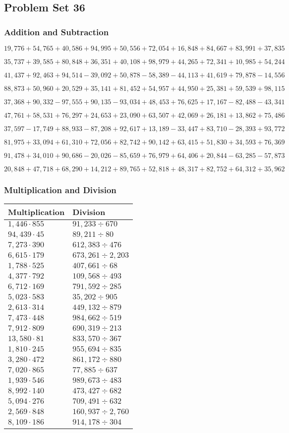 \hypertarget{problem-set-36-4}{%
\subsection{Problem Set 36}\label{problem-set-36-4}}

\hypertarget{addition-and-subtraction-258}{%
\subsubsection{Addition and
Subtraction}\label{addition-and-subtraction-258}}

\(19,776+54,765+40,586+94,995+50,556+72,054+16,848+84,667+83,991+ 37,835\)

\(35,737+39,585+80,848+36,351+40,108+98,979+44,265+72,341+10,985+54,244\)

\(41,437+92,463+94,514-39,092+50,878-58,389-44,113+41,619+79,878-14,556\)

\(88,873+50,960+20,529+35,141+81,452+54,957+44,950+25,381+59,539+98,115\)

\(37,368+90,332-97,555+90,135-93,034+48,453+76,625+17,167-82,488-43,341\)

\(47,761+58,531+76,297+24,653+23,090+63,507+42,069+26,181+13,862+75,486\)

\(37,597-17,749+88,933-87,208+92,617+13,189-33,447+83,710-28,393+93,772\)

\(81,975+33,094+61,310+72,056+82,742+90,142+63,415+51,830+34,593+76,369\)

\(91,478+34,010+90,686-20,026-85,659+76,979+64,406+20,844-63,285-57,873\)

\(20,848+47,718+68,290+14,212+89,765+52,818+48,317+82,752+64,312+35,962\)

\hypertarget{multiplication-and-division-257}{%
\subsubsection{Multiplication and
Division}\label{multiplication-and-division-257}}

\begin{longtable}[]{@{}ll@{}}
\toprule
Multiplication & Division\tabularnewline
\midrule
\endhead
\(1,446\cdot855\) & \(91,233÷670\)\tabularnewline
\(94,439\cdot45\) & \(89,211÷80\)\tabularnewline
\(7,273\cdot390\) & \(612,383÷476\)\tabularnewline
\(6,615\cdot179\) & \(673,261÷2,203\)\tabularnewline
\(1,788\cdot525\) & \(407,661÷68\)\tabularnewline
\(4,377\cdot792\) & \(109,568÷493\)\tabularnewline
\(6,712\cdot169\) & \(791,592÷285\)\tabularnewline
\(5,023\cdot583\) & \(35,202÷905\)\tabularnewline
\(2,613\cdot314\) & \(449,132÷879\)\tabularnewline
\(7,473\cdot448\) & \(984,662÷519\)\tabularnewline
\(7,912\cdot809\) & \(690,319÷213\)\tabularnewline
\(13,580\cdot81\) & \(833,570÷367\)\tabularnewline
\(1,810\cdot245\) & \(955,694÷835\)\tabularnewline
\(3,280\cdot472\) & \(861,172÷880\)\tabularnewline
\(7,020\cdot865\) & \(77,885÷637\)\tabularnewline
\(1,939\cdot546\) & \(989,673÷483\)\tabularnewline
\(8,992\cdot140\) & \(473,427÷682\)\tabularnewline
\(5,094\cdot276\) & \(709,491÷632\)\tabularnewline
\(2,569\cdot848\) & \(160,937÷2,760\)\tabularnewline
\(8,109\cdot186\) & \(914,178÷304\)\tabularnewline
\bottomrule
\end{longtable}

